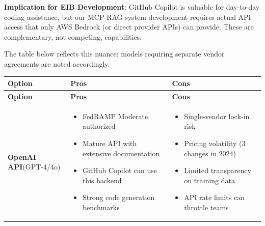 \documentclass[11pt]{article}
\begin{document}
\vspace{1em}
\textbf{Implication for EIB Development}: GitHub Copilot is valuable for day-to-day coding assistance, but our MCP-RAG system development requires actual API access that only AWS Bedrock (or direct provider APIs) can provide. These are complementary, not competing, capabilities.

\noindent The table below reflects this nuance: models requiring separate vendor agreements are noted accordingly.

\vspace{0.5em}
\renewcommand{\arraystretch}{1.4}
\begin{longtable}{@{}>{\raggedright}p{2.5cm}|p{5.5cm}|p{5.5cm}@{}}
\toprule
\textbf{Option} & \textbf{Pros} & \textbf{Cons} \\
\midrule
\endfirsthead%
\toprule
\textbf{Option} & \textbf{Pros} & \textbf{Cons} \\
\midrule
\endhead%

\textbf{OpenAI API}\newline(GPT-4/4o) &
\begin{itemize}[leftmargin=*, itemsep=1pt, topsep=0pt]
    \item FedRAMP Moderate authorized
    \item Mature API with extensive documentation
    \item GitHub Copilot can use this backend
    \item Strong code generation benchmarks
\end{itemize} &
\begin{itemize}[leftmargin=*, itemsep=1pt, topsep=0pt]
    \item Single-vendor lock-in risk
    \item Pricing volatility (3 changes in 2024)
    \item Limited transparency on training data
    \item API rate limits can throttle teams
\end{itemize} \\
\midrule


\end{longtable}
\end{document}

